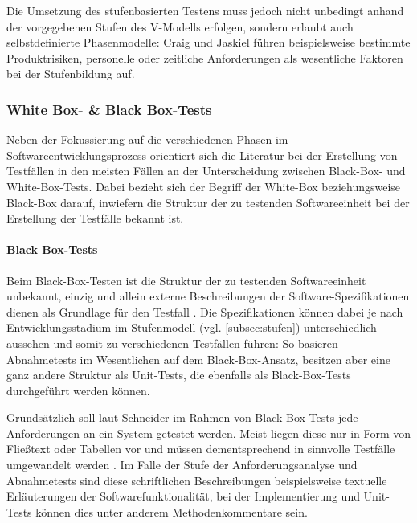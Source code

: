 Die Umsetzung des stufenbasierten Testens muss jedoch nicht unbedingt anhand der vorgegebenen Stufen des V-Modells erfolgen, sondern erlaubt auch selbstdefinierte Phasenmodelle: Craig und Jaskiel \cite[S. 98 f.]{craig2002systematic} führen beispielsweise bestimmte Produktrisiken, personelle oder zeitliche Anforderungen als wesentliche Faktoren bei der Stufenbildung auf.


\subsubsection{White Box- \& Black Box-Tests}\label{subsec:blackboxWhitebox}

Neben der Fokussierung auf die verschiedenen Phasen im Softwareentwicklungsprozess orientiert sich die Literatur bei der Erstellung von Testfällen in den meisten Fällen an der Unterscheidung zwischen Black-Box- und White-Box-Tests. Dabei bezieht sich der Begriff der White-Box beziehungsweise Black-Box darauf, inwiefern die Struktur der zu testenden Softwareeinheit bei der Erstellung der Testfälle bekannt ist.

\paragraph{Black Box-Tests}

Beim Black-Box-Testen ist die Struktur der zu testenden Softwareeinheit unbekannt, einzig und allein externe Beschreibungen der Software-Spezifikationen dienen als Grundlage für den Testfall \cite[S. 91]{schneider2012abenteuer}. Die Spezifikationen können dabei je nach Entwicklungsstadium im Stufenmodell (vgl. \autoref{subsec:stufen}) unterschiedlich aussehen und somit zu verschiedenen Testfällen führen: So basieren Abnahmetests im Wesentlichen auf dem Black-Box-Ansatz, besitzen aber eine ganz andere Struktur als Unit-Tests, die ebenfalls als Black-Box-Tests durchgeführt werden können.

Grundsätzlich soll laut Schneider \cite[S. 91]{schneider2012abenteuer} im Rahmen von Black-Box-Tests jede Anforderungen an ein System getestet werden. Meist liegen diese nur in Form von Fließtext oder Tabellen vor und müssen dementsprechend in sinnvolle Testfälle umgewandelt werden \cite[S. 92]{schneider2012abenteuer}. Im Falle der Stufe der Anforderungsanalyse und Abnahmetests sind diese schriftlichen Beschreibungen beispielsweise textuelle Erläuterungen der Softwarefunktionalität, bei der Implementierung und Unit-Tests können dies unter anderem Methodenkommentare sein.

